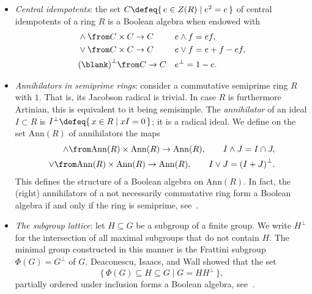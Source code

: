 \begin{example}\hfill
  \begin{itemize}
    \item\emph{Central idempotents}:
    the set \(C \defeq \{\,e\in Z(R)\mid e^2=e\,\}\) of central idempotents of a ring \(R\) is a Boolean algebra
    when endowed with
    \begin{align*}
      &\land \from C\times C \to C &&e \land f = ef,\\
      &\lor \from C \times C \to C &&e \lor f = e+f-ef,\\
      &{( \blank )}^{\perp}\from C \to C &&e^{\perp}=1-e.
    \end{align*}
    \item\emph{Annihilators in semiprime rings}:
    consider a commutative semiprime ring \(R\) with \(1\).
    That is, its Jacobson radical is trivial.
    In case \(R\) is furthermore Artinian, this is equivalent to it being semisimple.
    The \emph{annihilator} of an ideal \(I \subset R\) is \(I^{\perp} \defeq \{\,x\in R \mid xI=0\,\}\);
    it is a radical ideal.
    We define on the set \(\mathrm{Ann}(R)\) of annihilators the maps
    \begin{align*}
      \land \from \mathrm{Ann}(R) \times \mathrm{Ann}(R)\to \mathrm{Ann}(R), \qquad I \land J = I \cap J, \\
      \lor \from \mathrm{Ann}(R) \times \mathrm{Ann}(R)\to \mathrm{Ann}(R), \qquad I \lor J = {(I + J)}^{\perp}.
    \end{align*}
    This defines the structure of a Boolean algebra on \(\mathrm{Ann}(R)\).
    In fact,
    the (right) annihilators of a not necessarily commutative ring
    form a Boolean algebra
    if and only if the ring is semiprime, see~\cite{dube-taherifar2021:LatticeAnnihilatorIdeasSemiprime}.
    \item \emph{The subgroup lattice}:
    let \(H \subseteq G\) be a subgroup of a finite group.
    We write \(H^{\perp}\) for the intersection of all maximal subgroups that do not contain \(H\).
    The minimal group constructed in this manner is the Frattini subgroup \(\Phi(G)=G^{\perp}\) of \(G\).
    Deaconescu, Isaacs, and Wall showed that the set
    \[
      \{\, \Phi(G) \subseteq H \subseteq G \mid G= HH^{\perp} \,\},
    \]
    partially ordered under inclusion forms a Boolean algebra,
    see~\cite{deaconescu-isaacs-walls2011:BooleanLatticeFrattiniSubgroup}.
  \end{itemize}
\end{example}

